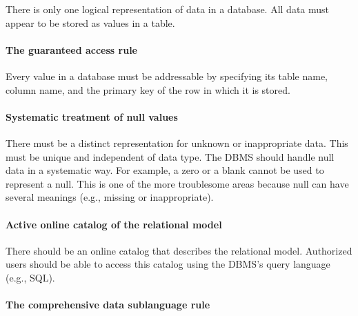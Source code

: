 \documentclass[
]{article}
\begin{document}
There is only one logical representation of data in a database. All data
must appear to be stored as values in a table.

\hypertarget{the-guaranteed-access-rule}{%
\paragraph*{The guaranteed access rule}\label{the-guaranteed-access-rule}}

Every value in a database must be addressable by specifying its table
name, column name, and the primary key of the row in which it is stored.

\hypertarget{systematic-treatment-of-null-values}{%
\paragraph*{Systematic treatment of null values}\label{systematic-treatment-of-null-values}}

There must be a distinct representation for unknown or inappropriate
data. This must be unique and independent of data type. The DBMS should
handle null data in a systematic way. For example, a zero or a blank
cannot be used to represent a null. This is one of the more troublesome
areas because null can have several meanings (e.g., missing or
inappropriate).

\hypertarget{active-online-catalog-of-the-relational-model}{%
\paragraph*{Active online catalog of the relational model}\label{active-online-catalog-of-the-relational-model}}

There should be an online catalog that describes the relational model.
Authorized users should be able to access this catalog using the DBMS's
query language (e.g., SQL).

\hypertarget{the-comprehensive-data-sublanguage-rule}{%
\paragraph*{The comprehensive data sublanguage rule}\label{the-comprehensive-data-sublanguage-rule}}
\end{document}

